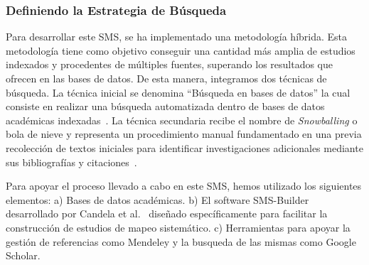 \subsubsection{Definiendo la Estrategia de Búsqueda}\label{subsubsec:estrategia-busqueda}

Para desarrollar este SMS, se ha implementado una metodología híbrida. Esta metodología tiene como objetivo conseguir una cantidad más amplia de estudios indexados y procedentes de múltiples fuentes, superando los resultados que ofrecen en las bases de datos. De esta manera, integramos dos técnicas de búsqueda. La técnica inicial se denomina ``Búsqueda en bases de datos'' la cual consiste en realizar una búsqueda automatizada dentro de bases de datos académicas indexadas~\cite{Jalai-01}. La técnica secundaria recibe el nombre de \textit{Snowballing} o bola de nieve y representa un procedimiento manual fundamentado en una previa recolección de textos iniciales para identificar investigaciones adicionales mediante sus bibliografías y citaciones~\cite{Jalai-01,Goodman-01}.

Para apoyar el proceso llevado a cabo en este SMS, hemos utilizado los siguientes elementos: a) Bases de datos académicas. b) El software SMS-Builder desarrollado por Candela et al.~\cite{Candela2022100935} diseñado específicamente para facilitar la construcción de estudios de mapeo sistemático. c) Herramientas para apoyar la gestión de referencias como Mendeley y la busqueda de las mismas como Google Scholar.
